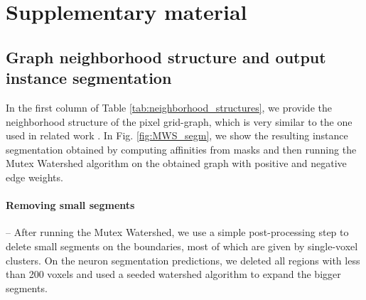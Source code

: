 
\renewcommand{\thesection}{S\arabic{section}}
\renewcommand{\thetable}{S\arabic{table}}
\renewcommand{\thefigure}{S\arabic{figure}}

\section{Supplementary material}




\subsection{Graph neighborhood structure and output instance segmentation}
In the first column of Table \ref{tab:neighborhood_structures}, we provide the neighborhood structure of the pixel grid-graph, which is very similar to the one used in related work \cite{wolf2018mutex,lee2017superhuman}.
In Fig. \ref{fig:MWS_segm}, we show the resulting instance segmentation obtained by computing affinities from \maskname masks and then running the Mutex Watershed algorithm on the obtained graph with positive and negative edge weights.

\paragraph{Removing small segments} -- After running the Mutex Watershed, we use a simple post-processing step to delete small segments on the boundaries, most of which are given by single-voxel clusters. On the neuron segmentation predictions, we deleted all regions with less than 200 voxels and used a seeded watershed algorithm to expand the bigger segments.


